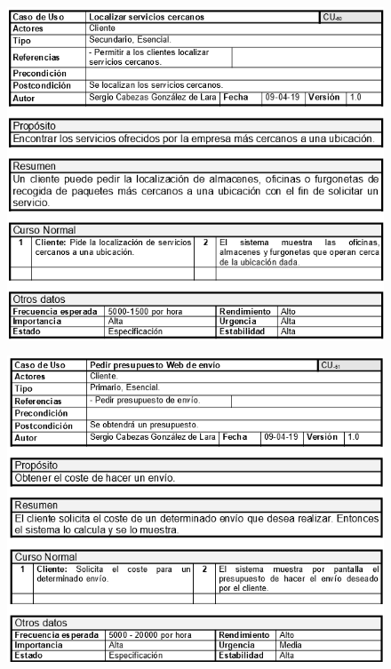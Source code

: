 \begin{figure}[H]
	\centering
	\includegraphics[width=16cm]{50}
\end{figure}
\begin{figure}[H]
	\centering
	\includegraphics[width=16cm]{51}
\end{figure}
